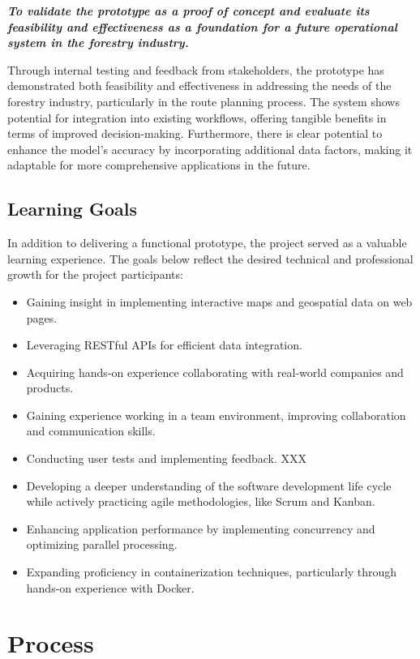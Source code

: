 \textbf{\textit{To validate the prototype as a proof of concept and evaluate its feasibility and effectiveness as a foundation for a future operational system in the forestry industry.}}

Through internal testing and feedback from stakeholders, the prototype has demonstrated both feasibility and effectiveness in addressing the needs of the forestry industry, particularly in the route planning process. The system shows potential for integration into existing workflows, offering tangible benefits in terms of improved decision-making. Furthermore, there is clear potential to enhance the model’s accuracy by incorporating additional data factors, making it adaptable for more comprehensive applications in the future.

\subsection{Learning Goals}

In addition to delivering a functional prototype, the project served as a valuable learning experience. The goals below reflect the desired technical and professional growth for the project participants:

\begin{itemize}
    \item Gaining insight in implementing interactive maps and geospatial data on web pages.
    \item Leveraging RESTful APIs for efficient data integration.
    \item Acquiring hands-on experience collaborating with real-world companies and products.
    \item Gaining experience working in a team environment, improving collaboration and communication skills.
    \item Conducting user tests and implementing feedback. XXX
    \item Developing a deeper understanding of the software development life cycle while actively practicing agile methodologies, like Scrum and Kanban.
    \item Enhancing application performance by implementing concurrency and optimizing parallel processing.
    \item Expanding proficiency in containerization techniques, particularly through hands-on experience with Docker.
\end{itemize}


\section{Process}\label{sec:discussion:process}

